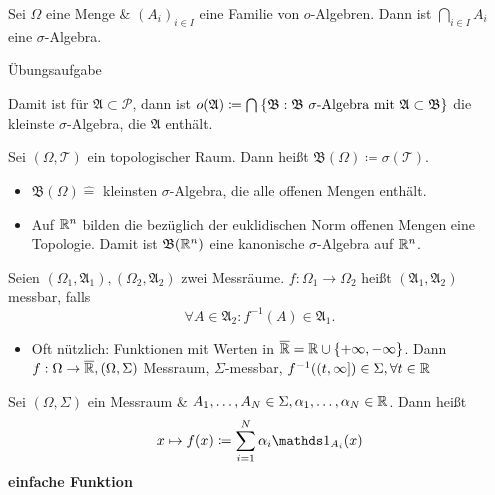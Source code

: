 \begin{lemma}
	Sei $ \Omega $ eine Menge \& $ \left( A_i \right) _{i \in I}  $ eine Familie von $ o $-Algebren.
	Dann ist $ \bigcap_{i \in  I} A_i $ eine $ \sigma $-Algebra.
\end{lemma}
\begin{proof*}
	Übungsaufgabe
\end{proof*}

Damit ist für $ \mathfrak{A} \subset \mathcal{P}  $, dann ist $ o(\mathfrak{A} ) \coloneqq \bigcap_{} \left\{ \mathfrak{B} : \mathfrak{B} \text{ $ \sigma $-Algebra mit $ \mathfrak{A}  \subset \mathfrak{B}  $}  \right\}  $ die kleinste $ \sigma $-Algebra, die $ \mathfrak{A}  $ enthält.

\begin{definition}
	Sei $ (\Omega, \mathcal{T} ) $ ein topologischer Raum. Dann heißt $ \mathfrak{B} (\Omega) \coloneqq \sigma(\mathcal{T} ) $.
	\begin{itemize}
		\item $ \mathfrak{B} (\Omega) \hat{=}  $ kleinsten $ \sigma $-Algebra, die alle offenen Mengen enthält.
		\item Auf $ \mathbb{R} ^n $ bilden die bezüglich der euklidischen Norm offenen Mengen eine Topologie.
			Damit ist $ \mathfrak{B} (\mathbb{R} ^n) $ eine kanonische $ \sigma $-Algebra auf $ \mathbb{R} ^n $.
	\end{itemize}
\end{definition}

\begin{definition}
	Seien $ (\Omega_1, \mathfrak{A}_1 ), (\Omega_2, \mathfrak{A} _2) $ zwei Messräume.
	$ f : \Omega_1 \to \Omega_2 $ heißt $ (\mathfrak{A} _1, \mathfrak{A} _2) $ messbar, falls
	\[
		\forall A \in \mathfrak{A} _2 : f^{-1} (A) \in \mathfrak{A} _1.
	\]
	\begin{itemize}
		\item Oft nützlich: Funktionen mit Werten in $ \overline{\mathbb{R} } = \mathbb{R}  \cup \left\{ + \infty, - \infty \right\}  $.
			Dann $ f : \Omega \to \overline{\mathbb{R} }, (\Omega, \Sigma ) $ Messraum,
			$ \Sigma $-messbar, $ f^{-1} ((t, \infty]) \in \Sigma , \forall t \in \mathbb{R}  $
	\end{itemize}
\end{definition}

\begin{example}
	Sei $ (\Omega, \Sigma) $ ein Messraum \& $ A_1, \dotsc, A_N \in \Sigma, \alpha_1, \dotsc, \alpha_N \in \mathbb{R}  $.
	Dann heißt
	\[
		x \mapsto f(x) \coloneqq \sum_{i=1}^{N} \alpha_i \I_{A_i}(x)
	\]
	\textbf{einfache Funktion}
\end{example}

